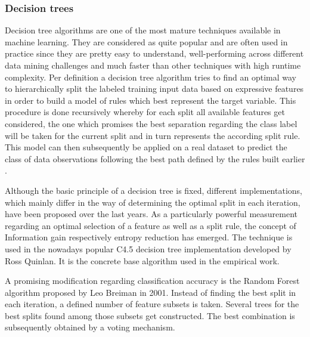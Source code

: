 \subsubsection{Decision trees}
\label{sssec:decisionTrees}
Decision tree algorithms are one of the most mature techniques available in machine learning. They are considered as quite popular and are often used in practice since they are pretty easy to understand, well-performing across different data mining challenges and much faster than other techniques with high runtime complexity. Per definition a decision tree algorithm tries to find an optimal way to hierarchically split the labeled training input data based on expressive features in order to build a model of rules which best represent the target variable. This procedure is done recursively whereby for each split all available features get considered, the one which promises the best separation regarding the class label will be taken for the current split and in turn represents the according split rule. This model can then subsequently be applied on a real dataset to predict the class of data observations following the best path defined by the rules built earlier \cite{linoff2011data}. 

Although the basic principle of a decision tree is fixed, different implementations, which mainly differ in the way of determining the optimal split in each iteration, have been proposed over the last years. As a particularly powerful measurement regarding an optimal selection of a feature as well as a split rule, the concept of Information gain respectively entropy reduction has emerged. The technique is used in the nowadays popular C4.5 decision tree implementation developed by Ross Quinlan. It is the concrete base algorithm used in the empirical work. 

A promising modification regarding classification accuracy is the Random Forest algorithm proposed by Leo Breiman in 2001. Instead of finding the best split in each iteration, a defined number of feature subsets is taken. Several trees for the best splits found among those subsets get constructed. The best combination is subsequently obtained by a voting mechanism. 

